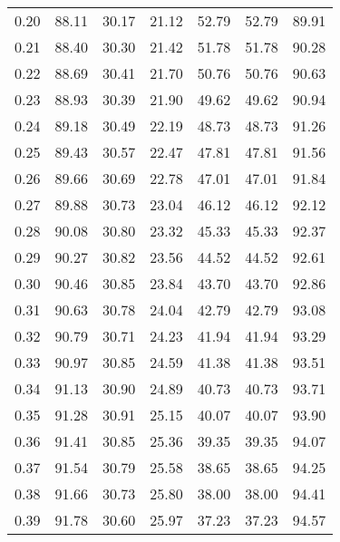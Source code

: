\begin{tabular}{|c|c|c|c|c|c|c|}
      0.20 &     88.11 &     30.17 &      21.12 &   52.79 &      52.79 &         89.91 \\
      0.21 &     88.40 &     30.30 &      21.42 &   51.78 &      51.78 &         90.28 \\
      0.22 &     88.69 &     30.41 &      21.70 &   50.76 &      50.76 &         90.63 \\
      0.23 &     88.93 &     30.39 &      21.90 &   49.62 &      49.62 &         90.94 \\
      0.24 &     89.18 &     30.49 &      22.19 &   48.73 &      48.73 &         91.26 \\
      0.25 &     89.43 &     30.57 &      22.47 &   47.81 &      47.81 &         91.56 \\
      0.26 &     89.66 &     30.69 &      22.78 &   47.01 &      47.01 &         91.84 \\
      0.27 &     89.88 &     30.73 &      23.04 &   46.12 &      46.12 &         92.12 \\
      0.28 &     90.08 &     30.80 &      23.32 &   45.33 &      45.33 &         92.37 \\
      0.29 &     90.27 &     30.82 &      23.56 &   44.52 &      44.52 &         92.61 \\
      0.30 &     90.46 &     30.85 &      23.84 &   43.70 &      43.70 &         92.86 \\
      0.31 &     90.63 &     30.78 &      24.04 &   42.79 &      42.79 &         93.08 \\
      0.32 &     90.79 &     30.71 &      24.23 &   41.94 &      41.94 &         93.29 \\
      0.33 &     90.97 &     30.85 &      24.59 &   41.38 &      41.38 &         93.51 \\
      0.34 &     91.13 &     30.90 &      24.89 &   40.73 &      40.73 &         93.71 \\
      0.35 &     91.28 &     30.91 &      25.15 &   40.07 &      40.07 &         93.90 \\
      0.36 &     91.41 &     30.85 &      25.36 &   39.35 &      39.35 &         94.07 \\
      0.37 &     91.54 &     30.79 &      25.58 &   38.65 &      38.65 &         94.25 \\
      0.38 &     91.66 &     30.73 &      25.80 &   38.00 &      38.00 &         94.41 \\
      0.39 &     91.78 &     30.60 &      25.97 &   37.23 &      37.23 &         94.57 \\

\end{tabular}
